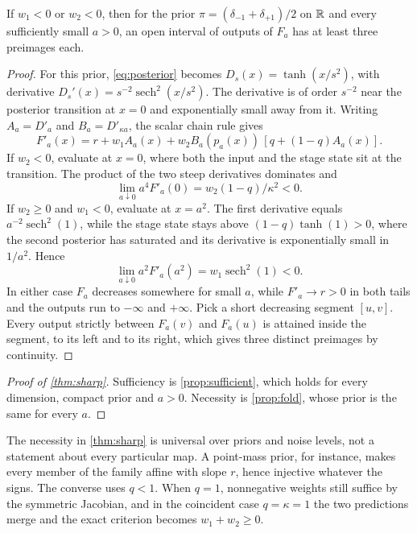 \begin{proposition}
\label{prop:fold}
If $w_1<0$ or $w_2<0$, then for the prior $\pi=(\delta_{-1}+\delta_{+1})/2$ on $\mathbb R$ and every sufficiently small $a>0$, an open interval of outputs of $F_a$ has at least three preimages each.
\end{proposition}
\begin{proof}
For this prior, \cref{eq:posterior} becomes $D_s(x)=\tanh(x/s^2)$, with derivative $D_s'(x)=s^{-2}\operatorname{sech}^2(x/s^2)$. The derivative is of order $s^{-2}$ near the posterior transition at $x=0$ and exponentially small away from it. Writing $A_a=D'_a$ and $B_a=D'_{\kappa a}$, the scalar chain rule gives
\begin{equation}
 F'_a(x)=r+w_1A_a(x)+w_2B_a(p_a(x))\,[q+(1-q)A_a(x)] .
 \label{eq:scalarderiv}
\end{equation}
If $w_2<0$, evaluate at $x=0$, where both the input and the stage state sit at the transition. The product of the two steep derivatives dominates and
\begin{equation}
 \lim_{a\downarrow0}a^4F'_a(0)=w_2(1-q)/\kappa^2<0.
\end{equation}
If $w_2\ge0$ and $w_1<0$, evaluate at $x=a^2$. The first derivative equals $a^{-2}\operatorname{sech}^2(1)$, while the stage state stays above $(1-q)\tanh(1)>0$, where the second posterior has saturated and its derivative is exponentially small in $1/a^2$. Hence
\begin{equation}
 \lim_{a\downarrow0}a^2F'_a(a^2)=w_1\operatorname{sech}^2(1)<0.
\end{equation}
In either case $F_a$ decreases somewhere for small $a$, while $F'_a\to r>0$ in both tails and the outputs run to $-\infty$ and $+\infty$. Pick a short decreasing segment $[u,v]$. Every output strictly between $F_a(v)$ and $F_a(u)$ is attained inside the segment, to its left and to its right, which gives three distinct preimages by continuity.
\end{proof}

\begin{proof}[Proof of \cref{thm:sharp}]
Sufficiency is \cref{prop:sufficient}, which holds for every dimension, compact prior and $a>0$. Necessity is \cref{prop:fold}, whose prior is the same for every $a$.
\end{proof}

The necessity in \cref{thm:sharp} is universal over priors and noise levels, not a statement about every particular map. A point-mass prior, for instance, makes every member of the family affine with slope $r$, hence injective whatever the signs. The converse uses $q<1$. When $q=1$, nonnegative weights still suffice by the symmetric Jacobian, and in the coincident case $q=\kappa=1$ the two predictions merge and the exact criterion becomes $w_1+w_2\ge0$.


